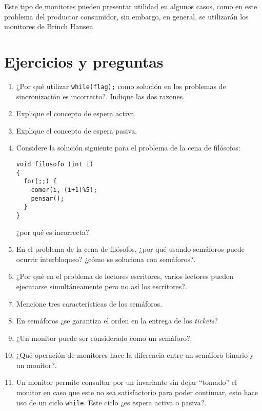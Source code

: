 Este tipo de monitores pueden presentar utilidad en algunos casos, como en este
problema del productor consumidor, sin embargo, en general, se utilizarán los
monitores de Brinch Hansen.

\section{Ejercicios y preguntas}
\begin{enumerate}

\item ¿Por qué utilizar \texttt{while(flag);} como solución en los problemas de
sincronización es incorrecto?. Indique las dos razones.

\item Explique el concepto de espera activa.

\item Explique el concepto de espera pasiva.

\item Considere la solución siguiente para el problema de la cena de
filósofos:

\begin{lstlisting}
void filosofo (int i)
{
  for(;;) {
    comer(i, (i+1)%5);
    pensar();
  }
}
\end{lstlisting}

¿por qué es incorrecta?

\item En el problema de la cena de filósofos, ¿por qué usando semáforos puede
ocurrir interbloqueo? ¿cómo se soluciona con semáforos?.

\item ¿Por qué en el problema de lectores escritores, varios lectores
pueden ejecutarse simultáneamente pero no así los escritores?.

\item Mencione tres características de los semáforos.

\item En semáforos ¿se garantiza el orden en la entrega de los \emph{tickets}?

\item ¿Un monitor puede ser considerado como un semáforo?.

\item ¿Qué operación de monitores hace la diferencia entre un semáforo binario y
un monitor?.

\item Un monitor permite consultar por un invariante sin dejar ``tomado'' el
monitor en caso que este no sea satisfactorio para poder continuar, esto hace
uso de un ciclo \texttt{while}. Este ciclo ¿es espera activa o pasiva?.


\end{enumerate}
